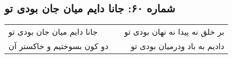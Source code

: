 \begin{center}
\section*{شماره ۶۰: جانا دایم میان جان بودی تو}
\label{sec:060}
\begin{longtable}{l p{0.5cm} r}
جانا دایم میان جان بودی تو
&&
بر خلق نه پیدا نه نهان بودی تو
\\
دو کون بسوختیم و خاکستر آن
&&
دادیم به باد ودرمیان بودی تو
\\
\end{longtable}
\end{center}
